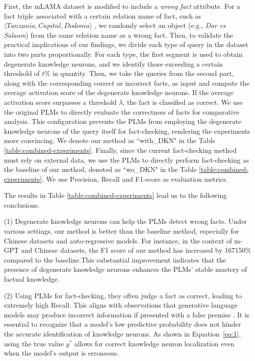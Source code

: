 \documentclass[]{article}
\newcommand{\vpara}[1]{noindent\textbf{#1 }}%
\begin{document}
 First, the mLAMA dataset is modified to include a \textit{wrong fact} attribute.
 For a fact triple associated with a certain relation name of fact, such as $\langle \textit{Tanzania}, \textit{Capital}, \textit{Dodoma} \rangle$ , we randomly select an object (e.g., \textit{Dar es Salaam}) from the same relation name as a wrong fact.
Then, to validate the practical implications of our findings, we divide each type of query in the dataset into two parts proportionally. For each type, the first segment is used to obtain degenerate knowledge neurons, and we identify those exceeding a certain threshold of \( t\% \) in quantity.
Then, we take the queries from the second part, along with the corresponding correct or incorrect facts, as input and compute the average activation score of the degenerate knowledge neurons. If the average activation score surpasses a threshold $\lambda$, the fact is classified as correct.
We use the original PLMs to directly evaluate the correctness of facts for comparative analysis. This configuration prevents the PLMs from employing the degenerate knowledge neurons of the query itself for fact-checking, rendering the experiments more convincing. We denote our method as ``with\_DKN" in the Table \ref{table:combined-experiments}.
Finally, since the current fact-checking method must rely on external data, we use the PLMs to directly perform fact-checking as the baseline of our method, denoted as ``wo\_DKN" in the Table \ref{table:combined-experiments}. We use Precision, Recall and F1-score as evaluation metrics.

The results in Table \ref{table:combined-experiments} lead us to the following conclusions.

(1) Degenerate knowledge neurons can help the PLMs detect wrong facts. Under various settings, our method is better than the baseline method, especially for Chinese datasets and auto-regressive models. For instance, in the context of m-GPT and Chinese datasets, the F1 score of our method has increased by 167150\% compared to the baseline.This substantial improvement indicates that the presence of degenerate knowledge neurons enhances the PLMs' stable mastery of factual knowledge.

(2) Using PLMs for fact-checking, they often judge a fact as correct, leading to extremely high Recall. This aligns with observations that generative language models may produce incorrect information if presented with a false premise \cite{hallucination_chatgpt3, lakshmanan2022large, metz2022new}.
It is essential to recognize that a model's low predictive probability does not hinder the accurate identification of knowledge neurons. As shown in Equation~\ref{eq:1}, using the true value \( y^* \) allows for correct knowledge neuron localization even when the model's output is erroneous.
\end{document}
